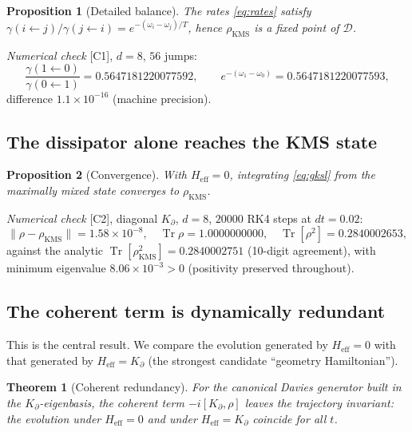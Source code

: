 \documentclass[11pt,a4paper]{article}
\theoremstyle{plain}
\newtheorem{theorem}{Theorem}
\newtheorem{proposition}{Proposition}
\theoremstyle{definition}
\newcommand{\Kp}{K_{\partial}}
\newcommand{\rhoKMS}{\rho_{\mathrm{KMS}}}
\newcommand{\Tr}{\operatorname{Tr}}
\newcommand{\Heff}{H_{\mathrm{eff}}}
\newcommand{\status}[1]{{\small\textsf{[#1]}}}
\begin{document}
\begin{proposition}[Detailed balance]\label{prop:db}
The rates \eqref{eq:rates} satisfy
$\gamma(i\!\leftarrow\! j)/\gamma(j\!\leftarrow\! i)=e^{-(\omega_i-\omega_j)/T}$,
hence $\rhoKMS$ is a fixed point of $\mathcal{D}$.
\end{proposition}

\noindent\emph{Numerical check} \status{C1}, $d=8$, $56$ jumps:
\[
  \frac{\gamma(1\!\leftarrow\!0)}{\gamma(0\!\leftarrow\!1)}
  = 0.5647181220077592,
  \qquad
  e^{-(\omega_1-\omega_0)} = 0.5647181220077593,
\]
difference $1.1\times10^{-16}$ (machine precision).

\subsection{The dissipator alone reaches the KMS state}

\begin{proposition}[Convergence]\label{prop:conv}
With $\Heff=0$, integrating \eqref{eq:gksl} from the maximally mixed state
converges to $\rhoKMS$.
\end{proposition}

\noindent\emph{Numerical check} \status{C2}, diagonal $\Kp$, $d=8$, $20000$ RK4
steps at $dt=0.02$:
\[
  \lVert\rho-\rhoKMS\rVert = 1.58\times10^{-8},
  \quad
  \Tr\rho = 1.0000000000,
  \quad
  \Tr[\rho^2]=0.2840002653,
\]
against the analytic $\Tr[\rhoKMS^2]=0.2840002751$ (10-digit agreement), with
minimum eigenvalue $8.06\times10^{-3}>0$ (positivity preserved throughout).

\subsection{The coherent term is dynamically redundant}\label{sec:redundant}

This is the central result. We compare the evolution generated by $\Heff=0$ with
that generated by $\Heff=\Kp$ (the strongest candidate ``geometry Hamiltonian'').

\begin{theorem}[Coherent redundancy]\label{thm:redundant}
For the canonical Davies generator built in the $\Kp$-eigenbasis, the coherent
term $-i[\Kp,\rho]$ leaves the trajectory invariant: the evolution under
$\Heff=0$ and under $\Heff=\Kp$ coincide for all $t$.
\end{theorem}
\end{document}
